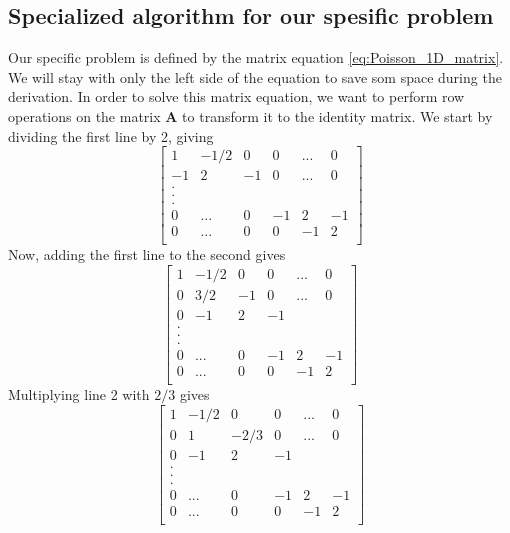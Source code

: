 \documentclass[reprint, english,notitlepage]{revtex4-1}  %
\begin{document}
\subsection{Specialized algorithm for our spesific problem}

Our specific problem is defined by the matrix equation \ref{eq:Poisson_1D_matrix}. We will stay with only the left side of the equation to save som space during the derivation. In order to solve this matrix equation, we want to perform row operations on the matrix $\boldsymbol A$ to transform it to the identity matrix. We start by dividing the first line by 2, giving
\begin{equation*}{}
  \begin{bmatrix}
1  & -1/2 & 0  & 0 & ... & 0 \\
-1 & 2  & -1 & 0 & ... & 0 \\
.  &    &    &   &     & \\
.  &    &    &   &     & \\
.  &    &    &   &     & \\
0  & ...& 0  &-1 & 2   & -1  \\
0  & ...& 0  & 0 &-1 & 2  \\
\end{bmatrix}
\end{equation*}
Now, adding the first line to the second gives
\begin{equation*}{}
  \begin{bmatrix}
1  & -1/2 & 0  & 0  & ... & 0 \\
0  & 3/2  & -1 & 0  & ... & 0 \\
0  & -1   &  2 & -1 &     & \\
.  &    &    &   &     & \\
.  &    &    &   &     & \\
.  &    &    &   &     & \\
0  & ...& 0  &-1 & 2   & -1  \\
0  & ...& 0  & 0 &-1 & 2  \\
\end{bmatrix}
\end{equation*}
Multiplying line 2 with $2/3$ gives
\begin{equation*}{}
  \begin{bmatrix}
1  & -1/2 & 0  & 0  & ... & 0 \\
0  & 1  & -2/3 & 0  & ... & 0 \\
0  & -1   &  2 & -1 &     & \\
.  &    &    &   &     & \\
.  &    &    &   &     & \\
.  &    &    &   &     & \\
0  & ...& 0  &-1 & 2   & -1  \\
0  & ...& 0  & 0 &-1 & 2  \\
\end{bmatrix}
\end{equation*}
\end{document}
